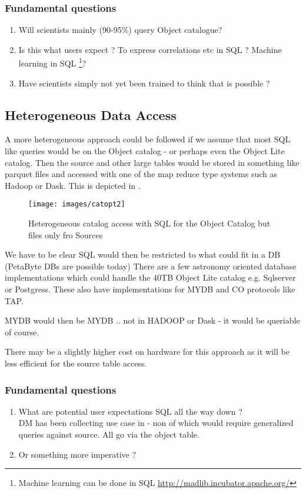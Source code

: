 \subsubsection{Fundamental questions}
\begin{enumerate}
\item Will scientists mainly (90-95\%) query Object catalogue?
\item  Is this what users expect ? To express correlations etc in SQL ? Machine learning in SQL
\footnote{Machine learning  can be done in SQL \url{http://madlib.incubator.apache.org/}}?
\item Have scientists  simply not yet been trained to think that is possible ?
\end{enumerate}

\subsection{Heterogeneous Data Access }
 A more heterogeneous approach could be followed if we assume that most SQL like queries would be on the Object catalog - or perhaps even the Object Lite catalog.  Then the source and other large tables would be stored in something like parquet files and accessed with one of the map reduce type systems such as Hadoop or Dask. This is depicted in .

\begin{figure}
\begin{center}
 \texttt{[image: images/catopt2]}
\caption{ Heterogeneous catalog access with SQL for the Object Catalog but files only fro Sources \label{fig:catopt2}}
\end{center}
\end{figure}

We have to be clear SQL would then be restricted to what could fit in a DB (PetaByte DBs are possible today)
There are a few astronomy oriented database implementations which could handle the 40TB Object Lite catalog e.g. Sqlserver or Postgress. These also have implementations for MYDB and CO protocols like TAP.

MYDB would then be MYDB .. not in HADOOP or Dask - it would be queriable of course.

There may be a slightly higher cost on hardware for this approach as it will be less efficient for the source table access.

\subsubsection{Fundamental questions}
\begin{enumerate}
 \item What are potential user expectations SQL all the way down ? \\
DM has been collecting use case in  - non of which would require generalized queries against source. All go via the object table.
 \item Or something more imperative ?
\end{enumerate}


